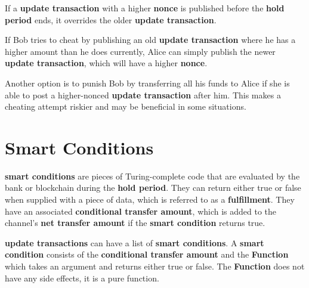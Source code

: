 \documentclass[a4paper]{article}
\newcommand{\bgls}[1]{\textbf{\gls{#1}}}
\newcommand{\bglspl}[1]{\textbf{\glspl{#1}}}
\begin{document}
If a \bgls{update transaction} with a higher \bgls{nonce} is published before the \bgls{hold period} ends, it overrides the older \bgls{update transaction}.

If Bob tries to cheat by publishing an old \bgls{update transaction} where he has a higher amount than he does currently, Alice can simply publish the newer \bgls{update transaction}, which will have a higher \bgls{nonce}.

Another option is to punish Bob by transferring all his funds to Alice if she is able to post a higher-nonced \bgls{update transaction} after him. This makes a cheating attempt riskier and may be beneficial in some situations.

\section{Smart Conditions}

\bglspl{smart condition} are pieces of Turing-complete code that are evaluated by the bank or blockchain during the \bgls{hold period}. They can return either true or false when supplied with a piece of data, which is referred to as a \bgls{fulfillment}. They have an associated \bgls{conditional transfer amount}, which is added to the channel's \bgls{net transfer amount} if the \bgls{smart condition} returns true.

\bglspl{update transaction} can have a list of \bglspl{smart condition}. A \bgls{smart condition} consists of the \bgls{conditional transfer amount} and the \textbf{Function} which takes an argument and returns either true or false. The \textbf{Function} does not have any side effects, it is a pure function.
\end{document}
